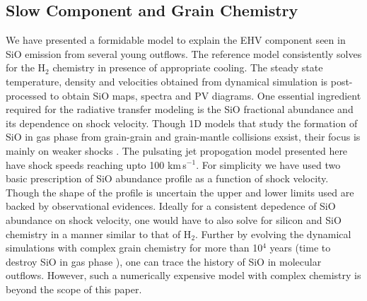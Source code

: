 \documentclass[useAMS,usenatbib,letters]{mn2e}
\begin{document}
\subsection{Slow Component and Grain Chemistry}
%
We have presented a formidable model to explain the EHV component seen
in SiO emission from several young outflows. The reference model
consistently solves for the H$_{2}$ chemistry in presence of
appropriate cooling. The steady state temperature, density and velocities obtained from dynamical
simulation is post-processed to obtain SiO maps, spectra and PV
diagrams. One essential ingredient required for the radiative transfer modeling
is the SiO fractional abundance and its dependence on shock velocity. 
Though 1D models that study the formation of SiO in gas phase from grain-grain and grain-mantle
collisions exsist, their focus is mainly on weaker shocks
\cite{Schilke:1997p14140, Caselli:1997p14853, Gusdorf:2008p13800}. 
The pulsating jet propogation model presented here have shock speeds
reaching upto 100 km\,s$^{-1}$. For simplicity we have used two basic
prescription of SiO abundance profile as a function of shock
velocity. Though the shape of the profile is uncertain the upper and
lower limits used are backed by observational evidences. Ideally for a consistent
depedence of SiO abundance on shock velocity, one would have to also
solve for silicon and SiO chemistry in a manner similar to that of
H$_{2}$. Further by evolving the dynamical simulations with complex
grain chemistry for more than 10$^{4}$ years (time to destroy SiO in
gas phase \cite{Codella:1999p12584}),  one can trace the history of 
SiO in molecular outflows. However, such a numerically expensive model 
with complex chemistry is beyond the scope of this paper.  
%
\end{document}
